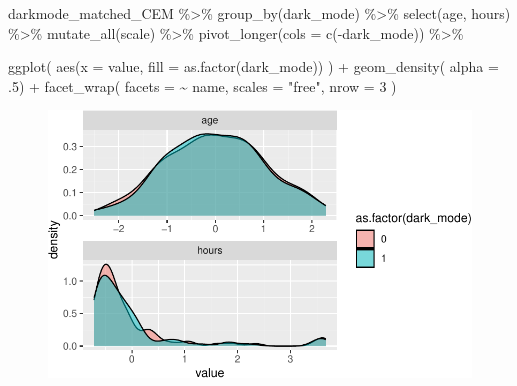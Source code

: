 \documentclass[
  a4paper,
  DIV=11,
  oneside]{scrreprt}
\newenvironment{Shaded}{\begin{snugshade}}{\end{snugshade}}
\newcommand{\AttributeTok}[1]{\textcolor[rgb]{0.40,0.45,0.13}{#1}}
\newcommand{\DecValTok}[1]{\textcolor[rgb]{0.68,0.00,0.00}{#1}}
\newcommand{\FunctionTok}[1]{\textcolor[rgb]{0.28,0.35,0.67}{#1}}
\newcommand{\NormalTok}[1]{\textcolor[rgb]{0.00,0.23,0.31}{#1}}
\newcommand{\SpecialCharTok}[1]{\textcolor[rgb]{0.37,0.37,0.37}{#1}}
\newcommand{\StringTok}[1]{\textcolor[rgb]{0.13,0.47,0.30}{#1}}
\begin{document}
\begin{Shaded}
\begin{Highlighting}[]
\NormalTok{darkmode\_matched\_CEM }\SpecialCharTok{\%\textgreater{}\%}
  \FunctionTok{group\_by}\NormalTok{(dark\_mode) }\SpecialCharTok{\%\textgreater{}\%}
  \FunctionTok{select}\NormalTok{(age, hours) }\SpecialCharTok{\%\textgreater{}\%}
  \FunctionTok{mutate\_all}\NormalTok{(scale) }\SpecialCharTok{\%\textgreater{}\%}
  \FunctionTok{pivot\_longer}\NormalTok{(}\AttributeTok{cols =} \FunctionTok{c}\NormalTok{(}\SpecialCharTok{{-}}\NormalTok{dark\_mode)) }\SpecialCharTok{\%\textgreater{}\%}
  
  \FunctionTok{ggplot}\NormalTok{(}
    \FunctionTok{aes}\NormalTok{(}\AttributeTok{x =}\NormalTok{ value, }\AttributeTok{fill =} \FunctionTok{as.factor}\NormalTok{(dark\_mode))}
\NormalTok{  ) }\SpecialCharTok{+}
  \FunctionTok{geom\_density}\NormalTok{( }\AttributeTok{alpha =}\NormalTok{ .}\DecValTok{5}\NormalTok{) }\SpecialCharTok{+} 
  \FunctionTok{facet\_wrap}\NormalTok{(}
    \AttributeTok{facets =} \SpecialCharTok{\textasciitilde{}}\NormalTok{ name, }
    \AttributeTok{scales =} \StringTok{"free"}\NormalTok{, }
    \AttributeTok{nrow =} \DecValTok{3}
\NormalTok{  )}
\end{Highlighting}
\end{Shaded}

\begin{figure}[t]

{\centering \includegraphics{Matching_files/figure-pdf/unnamed-chunk-38-1.pdf}

}

\end{figure}
\end{document}
